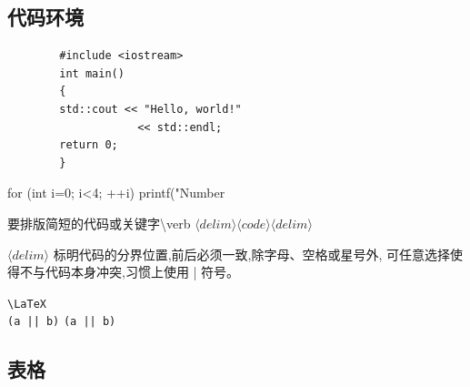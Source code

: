 \documentclass[a4paper]{ctexart}
\begin{document}
    \subsection{代码环境}
    \begin{verbatim}
        #include <iostream>
        int main() 
        {
        std::cout << "Hello, world!"
                    << std::endl;
        return 0;
        }
    \end{verbatim}
    \begin{verbatim*}
        for (int i=0; i<4; ++i)
        printf("Number %
    \end{verbatim*}
    要排版简短的代码或关键字\textbackslash verb $\langle delim\rangle\langle code\rangle\langle delim\rangle$\par
    $\langle delim\rangle$ 标明代码的分界位置,前后必须一致,除字母、空格或星号外,%
    可任意选择使得不与代码本身冲突,习惯上使用 | 符号。\par
    \verb|\LaTeX| \\ 
    \verb+(a || b)+ \verb*+(a || b)+    
    \subsection{表格}
\end{document}
